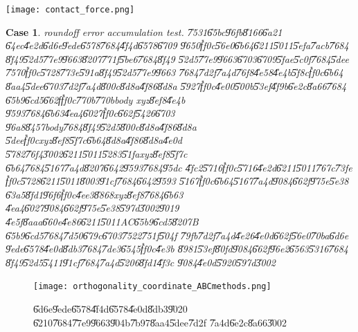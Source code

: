 \documentclass[12pt,a4paper]{article}
\newtheorem{case}[theorem]{Case}
\begin{document}
\begin{center}
\texttt{[image: contact\_force.png]}%
\end{center}

\clearpage%

\begin{case}
roundoff error accumulation test. \U{7531}\U{65bc}\U{96fb}\U{8166}\U{6a21}%
\U{64ec}\U{4e2d}\U{6d6e}\U{9ede}\U{6578}\U{7684}\U{4f4d}\U{6578}\U{6709}%
\U{9650}\U{ff0c}\U{56e0}\U{6b64}\U{6211}\U{5011}\U{5efa}\U{7acb}\U{7684}%
\U{8f49}\U{52d5}\U{77e9}\U{9663}\U{8207}\U{771f}\U{5be6}\U{7684}\U{8f49}%
\U{52d5}\U{77e9}\U{9663}\U{6703}\U{6709}\U{5fae}\U{5c0f}\U{7684}\U{5dee}%
\U{7570}\U{ff0c}\U{5728}\U{773e}\U{591a}\U{8f49}\U{52d5}\U{77e9}\U{9663}%
\U{7684}\U{7d2f}\U{7a4d}\U{76f8}\U{4e58}\U{4e4b}\U{5f8c}\U{ff0c}\U{6b64}%
\U{8aa4}\U{5dee}\U{6703}\U{7d2f}\U{7a4d}\U{800c}\U{8d8a}\U{4f86}\U{8d8a}%
\U{5927}\U{ff0c}\U{4e00}\U{500b}\U{53ef}\U{4f9b}\U{6e2c}\U{8a66}\U{7684}%
\U{65b9}\U{6cd5}\U{662f}\U{ff0c}\U{770b}\U{770b}body xyz\U{8ef8}\U{4e4b}%
\U{9593}\U{7684}\U{6b63}\U{4ea4}\U{6027}\U{ff0c}\U{662f}\U{5426}\U{6703}%
\U{96a8}\U{8457}body\U{7684}\U{8f49}\U{52d5}\U{800c}\U{8d8a}\U{4f86}\U{8d8a}%
\U{5dee}\U{ff0c}xyz\U{8ef8}\U{5f7c}\U{6b64}\U{8d8a}\U{4f86}\U{8d8a}\U{4e0d}%
\U{5782}\U{76f4}\U{3002}\U{6211}\U{5011}\U{5283}\U{51fa}xyz\U{8ef8}\U{5f7c}%
\U{6b64}\U{7684}\U{5167}\U{7a4d}\U{8207}\U{6642}\U{9593}\U{7684}\U{95dc}%
\U{4fc2}\U{5716}\U{ff0c}\U{5716}\U{4e2d}\U{6211}\U{5011}\U{767c}\U{73fe}%
\U{ff0c}\U{5728}\U{6211}\U{5011}\U{8003}\U{91cf}\U{7684}\U{6642}\U{9593}%
\U{5167}\U{ff0c}\U{6b64}\U{5167}\U{7a4d}\U{9084}\U{662f}\U{975e}\U{5e38}%
\U{63a5}\U{8fd1}\U{96f6}\U{ff0c}\U{4ee3}\U{8868}xyz\U{8ef8}\U{7684}\U{6b63}%
\U{4ea4}\U{6027}\U{9084}\U{662f}\U{975e}\U{5e38}\U{597d}\U{3002}\U{9019}%
\U{4e5f}\U{8aaa}\U{660e}\U{4e86}\U{6211}\U{5011}AC\U{65b9}\U{6cd5}\U{8207}B%
\U{65b9}\U{6cd5}\U{7684}\U{7d50}\U{679c}\U{6703}\U{7522}\U{751f}\U{504f}%
\U{79fb}\U{7d2f}\U{7a4d}\U{4e26}\U{4e0d}\U{662f}\U{56e0}\U{70ba}\U{6d6e}%
\U{9ede}\U{6578}\U{4e0d}\U{8db3}\U{7684}\U{7de3}\U{6545}\U{ff0c}\U{4e3b}%
\U{8981}\U{53ef}\U{80fd}\U{9084}\U{662f}\U{96e2}\U{6563}\U{5316}\U{7684}%
\U{8f49}\U{52d5}\U{5411}\U{91cf}\U{7684}\U{7a4d}\U{5206}\U{8fd1}\U{4f3c}%
\U{9084}\U{4e0d}\U{5920}\U{597d}\U{3002}
\end{case}

\begin{figure}[th]
\caption{\U{6d6e}\U{9ede}\U{6578}\U{4f4d}\U{6578}\U{4e0d}\U{8db3}\U{9020}%
\U{6210}\U{7684}\U{77e9}\U{9663}\U{904b}\U{7b97}\U{8aa4}\U{5dee}\U{7d2f}%
\U{7a4d}\U{6e2c}\U{8a66}\U{3002}}
\begin{center}
\texttt{[image: orthogonality\_coordinate\_ABCmethods.png]}
\end{center}
\end{figure}
\end{document}
